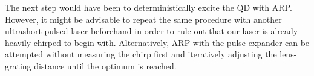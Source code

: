 The next step would have been to deterministically excite the \ac{QD} with \ac{ARP}.
However, it might be advisable to repeat the same procedure with another ultrashort pulsed laser beforehand in order to rule out that our laser is already heavily chirped to begin with.
Alternatively, \ac{ARP} with the pulse expander can be attempted without measuring the chirp first and iteratively adjusting the lens-grating distance until the optimum is reached. 